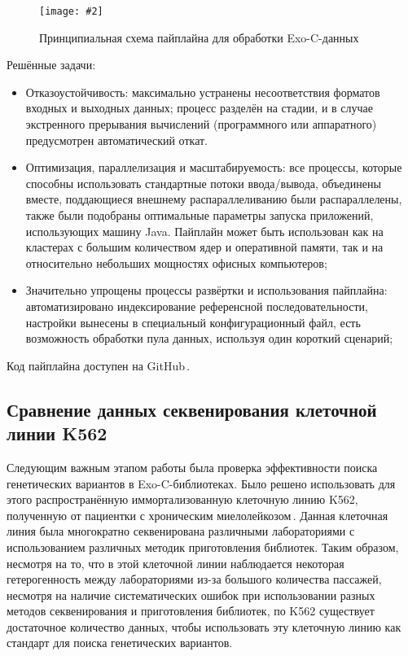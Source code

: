 \documentclass[a4paper,14pt]{extarticle}
\newcommand{\centerfigure}[5]
{\begin{figure}[#1]\centering\texttt{[image: \#2]}\caption{\label{#3}#4}\end{figure}}
\begin{document}
\centerfigure{h}{BlockScheme.pdf}{fig:pipeline}{Принципиальная схема пайплайна для обработки Exo-C-данных}{1}

Решённые задачи:

\begin{itemize}
	\item Отказоустойчивость: максимально устранены несоответствия форматов входных и выходных данных; процесс разделён на стадии, и в случае экстренного прерывания вычислений (программного или аппаратного) предусмотрен автоматический откат.
	\item Оптимизация, параллелизация и масштабируемость: все процессы, которые способны использовать стандартные потоки ввода/вывода, объединены вместе, поддающиеся внешнему распараллеливанию были распараллелены, также были подобраны оптимальные параметры запуска приложений, использующих машину Java.
	      Пайплайн может быть использован как на кластерах с большим количеством ядер и оперативной памяти, так и на относительно небольших мощностях офисных компьютеров;
	\item Значительно упрощены процессы развёртки и использования пайплайна: автоматизировано индексирование референсной последовательности, настройки вынесены в специальный конфигурационный файл, есть возможность обработки пула данных, используя один короткий сценарий;
\end{itemize}

Код пайплайна доступен на GitHub\,\citep{Scissors}.

\subsection{Сравнение данных секвенирования клеточной линии K562}

Следующим важным этапом работы была проверка эффективности поиска генетических вариантов в Exo-C\hyp{}библиотеках.
Было решено использовать для этого распространённую иммортализованную клеточную линию K562, полученную от пациентки с хроническим миелолейкозом\,\citep{Lozzio_1975}.
Данная клеточная линия была многократно секвенирована различными лабораториями с использованием различных методик приготовления библиотек.
Таким образом, несмотря на то, что в этой клеточной линии наблюдается некоторая гетерогенность между лабораториями из-за большого количества пассажей, несмотря на наличие систематических ошибок при использовании разных методов секвенирования и приготовления библиотек, по K562 существует достаточное количество данных, чтобы использовать эту клеточную линию как стандарт для поиска генетических вариантов.
\end{document}
